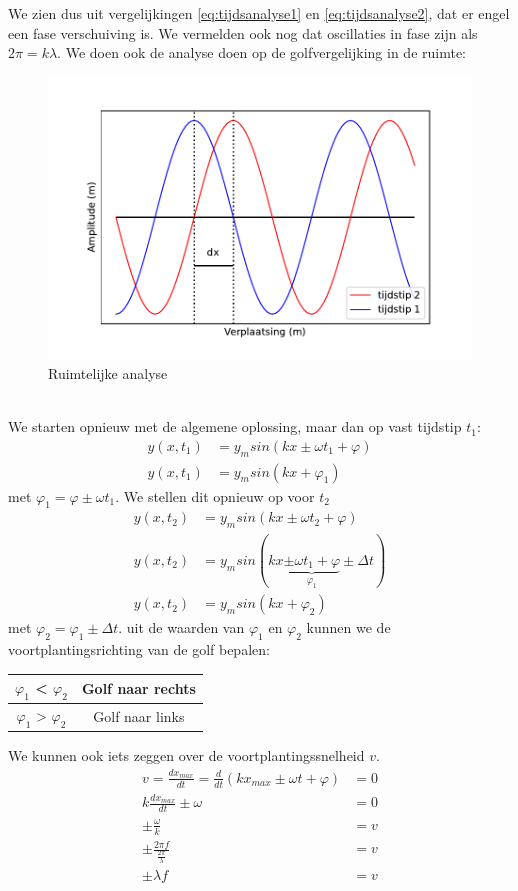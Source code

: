 \documentclass[a4paper,kul]{kulakarticle} %
\begin{document}
We zien dus uit vergelijkingen \ref{eq:tijdsanalyse1} en \ref{eq:tijdsanalyse2}, dat er engel een fase verschuiving is. We vermelden ook nog dat oscillaties in fase zijn als $2\pi = k\lambda$.
\newpage
We doen ook de analyse doen op de golfvergelijking in de ruimte:\\
\begin{figure}[h]
	\centering
	\includegraphics[width=0.7\linewidth]{ruimtelijke_analyse}
	\caption[Ruimtelijke analyse]{Ruimtelijke analyse}
	\label{fig:ruimtelijkeanalyse}
\end{figure}\\
We starten opnieuw met de algemene oplossing, maar dan op vast tijdstip $t_1$:
\begin{align}
	y(x,t_1) &= y_msin(kx \pm \omega t_1 +\varphi)\\
	\label{eq:ruimteanalyse1}
	y(x,t_1) &= y_msin(kx +\varphi_1)
\end{align}
met $\varphi_1 = \varphi \pm \omega t_1$. We stellen dit opnieuw op voor $t_2$
\begin{align}
	y(x,t_2) &= y_msin(kx \pm \omega t_2 +\varphi)\\
	y(x,t_2) &= y_msin(kx \underbrace{\pm \omega t_1 +\varphi}_{\varphi_1}\pm\Delta t)\\
	\label{eq:ruimteanalyse2}
	y(x,t_2) &= y_msin(kx +\varphi_2)
\end{align}
met $\varphi_2 = \varphi_1\pm\Delta t$.
uit de waarden van $\varphi_1$ en $\varphi_2$ kunnen we de voortplantingsrichting van de golf bepalen: 
\begin{center}
	\begin{tabular}{|c|c|}
		\hline
		$\varphi_1$ < $\varphi_2$& Golf naar rechts \\
		\hline
		$\varphi_1$ > $\varphi_2$& Golf naar links \\
		\hline
	\end{tabular} 
\end{center}
We kunnen ook iets zeggen over de voortplantingssnelheid $v$.
\begin{align*}
 v = \frac{dx_{max}}{dt} = \frac{d}{dt}(kx_{max} \pm \omega t +\varphi) &= 0\\
 k\frac{dx_{max}}{dt}\pm \omega & = 0\\
 \pm \frac{\omega}{k} & = v\\
 \pm\frac{2\pi f}{\frac{2\pi}{\lambda}} & = v\\
 \pm \lambda f & = v
\end{align*}
\newpage
\end{document}
